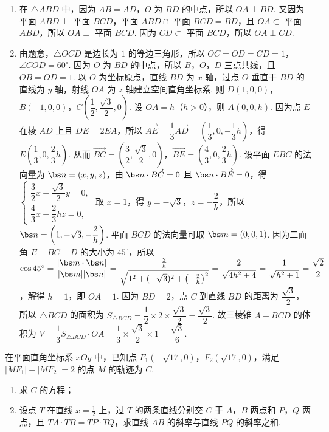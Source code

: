 \begin{solution}
\begin{enumerate}
    \item 在 \(\triangle ABD\) 中，因为 \(AB=AD\)，\(O\) 为 \(BD\) 的中点，所以 \(OA\perp BD\). 又因为平面 \(ABD\perp\) 平面 \(BCD\)，平面 \(ABD\cap\) 平面 \(BCD=BD\)，且 \(OA\subset\) 平面 \(ABD\)，所以 \(OA\perp\) 平面 \(BCD\). 因为 \(CD\subset\) 平面 \(BCD\)，所以 \(OA\perp CD\).
    \item 由题意，\(\triangle OCD\) 是边长为 \(1\) 的等边三角形，所以 \(OC=OD=CD=1\)，\(\angle COD=60^\circ\). 因为 \(O\) 为 \(BD\) 的中点，所以 \(B\)，\(O\)，\(D\) 三点共线，且 \(OB=OD=1\). 以 \(O\) 为坐标原点，直线 \(BD\) 为 \(x\) 轴，过点 \(O\) 垂直于 \(BD\) 的直线为 \(y\) 轴，射线 \(OA\) 为 \(z\) 轴建立空间直角坐标系. 则 \(D(1,0,0)\)，\(B(-1,0,0)\)，\(C\left(\dfrac12,\dfrac{\sqrt3}{2},0\right)\). 设 \(OA=h\)（\(h>0\)），则 \(A(0,0,h)\). 因为点 \(E\) 在棱 \(AD\) 上且 \(DE=2EA\)，所以 \(\overrightarrow{AE}=\dfrac13\overrightarrow{AD}=\left(\dfrac13,0,-\dfrac13h\right)\)，得 \(E\left(\dfrac13,0,\dfrac23h\right)\). 从而 \(\overrightarrow{BC}=\left(\dfrac32,\dfrac{\sqrt3}{2},0\right)\)，\(\overrightarrow{BE}=\left(\dfrac43,0,\dfrac23h\right)\). 设平面 \(EBC\) 的法向量为 \(\bs n=(x,y,z)\)，由 \(\bs n\cdot\overrightarrow{BC}=0\) 且 \(\bs n\cdot\overrightarrow{BE}=0\)，得
    \(\begin{cases}
    \dfrac32x+\dfrac{\sqrt3}{2}y=0,\\
    \dfrac43x+\dfrac23hz=0,
    \end{cases}\)
    取 \(x=1\)，得 \(y=-\sqrt3\)，\(z=-\dfrac{2}{h}\)，所以 \(\bs n=\left(1,-\sqrt3,-\dfrac2h\right)\). 平面 \(BCD\) 的法向量可取 \(\bs m=(0,0,1)\). 因为二面角 \(E-BC-D\) 的大小为 \(45^\circ\)，所以 \(\cos45^\circ=\dfrac{|\bs m\cdot\bs n|}{|\bs m||\bs n|}=\dfrac{\frac2h}{\sqrt{1^2+(-\sqrt3)^2+\left(-\frac2h\right)^2}}=\dfrac{2}{\sqrt{4h^2+4}}=\dfrac{1}{\sqrt{h^2+1}}=\dfrac{\sqrt2}{2}\)，解得 \(h=1\)，即 \(OA=1\). 因为 \(BD=2\)，点 \(C\) 到直线 \(BD\) 的距离为 \(\dfrac{\sqrt3}{2}\)，所以 \(\triangle BCD\) 的面积为 \(S_{\triangle BCD}=\dfrac12\times2\times\dfrac{\sqrt3}{2}=\dfrac{\sqrt3}{2}\). 故三棱锥 \(A-BCD\) 的体积为 \(V=\dfrac13S_{\triangle BCD}\cdot OA=\dfrac13\times\dfrac{\sqrt3}{2}\times1=\dfrac{\sqrt3}{6}\).
\end{enumerate}
\end{solution}

\begin{problem}
在平面直角坐标系 \(xOy\) 中，已知点 \(F_1(-\sqrt{17},0)\)，\(F_2(\sqrt{17},0)\)，满足 \(|MF_1|-|MF_2|=2\) 的点 \(M\) 的轨迹为 \(C\).

\begin{enumerate}
\item 求 \(C\) 的方程；
\item 设点 \(T\) 在直线 \(x=\frac{1}{2}\) 上，过 \(T\) 的两条直线分别交 \(C\) 于 \(A\)，\(B\) 两点和 \(P\)，\(Q\) 两点，且 \(TA\cdot TB=TP\cdot TQ\)，求直线 \(AB\) 的斜率与直线 \(PQ\) 的斜率之和.
\end{enumerate}
\end{problem}

